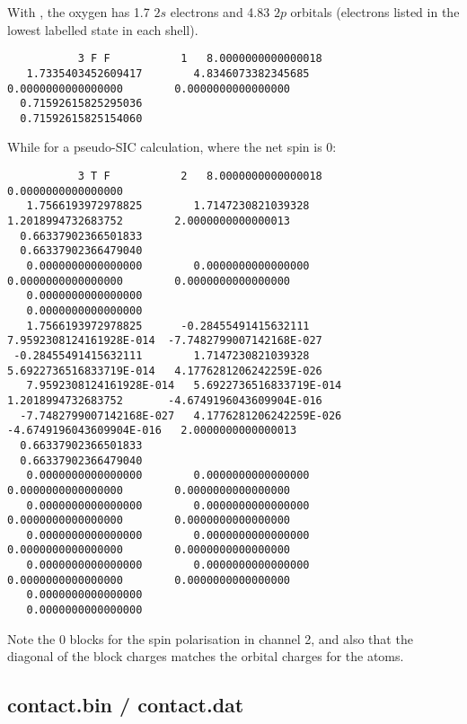 With , the oxygen has 1.7 $2s$ electrons and 4.83 $2p$
orbitals (electrons listed in the lowest labelled state in each shell).
\begin{tiny}
\begin{verbatim}
           3 F F           1   8.0000000000000018
   1.7335403452609417        4.8346073382345685        0.0000000000000000        0.0000000000000000
  0.71592615825295036
  0.71592615825154060
\end{verbatim}
\end{tiny}

While for a pseudo-SIC calculation, where the net spin is 0:
\begin{tiny}
\begin{verbatim}
           3 T F           2   8.0000000000000018        0.0000000000000000
   1.7566193972978825        1.7147230821039328        1.2018994732683752        2.0000000000000013
  0.66337902366501833
  0.66337902366479040
   0.0000000000000000        0.0000000000000000        0.0000000000000000        0.0000000000000000
   0.0000000000000000
   0.0000000000000000
   1.7566193972978825      -0.28455491415632111        7.9592308124161928E-014  -7.7482799007142168E-027
 -0.28455491415632111        1.7147230821039328        5.6922736516833719E-014   4.1776281206242259E-026
   7.9592308124161928E-014   5.6922736516833719E-014   1.2018994732683752       -4.6749196043609904E-016
  -7.7482799007142168E-027   4.1776281206242259E-026  -4.6749196043609904E-016   2.0000000000000013
  0.66337902366501833
  0.66337902366479040
   0.0000000000000000        0.0000000000000000        0.0000000000000000        0.0000000000000000
   0.0000000000000000        0.0000000000000000        0.0000000000000000        0.0000000000000000
   0.0000000000000000        0.0000000000000000        0.0000000000000000        0.0000000000000000
   0.0000000000000000        0.0000000000000000        0.0000000000000000        0.0000000000000000
   0.0000000000000000
   0.0000000000000000
\end{verbatim}
\end{tiny}
Note the 0 blocks for the spin polarisation in channel 2, and also that the
diagonal of the block charges matches the orbital charges for the atoms.

\subsection{contact.bin / contact.dat}
\label{app:contactfiles}

